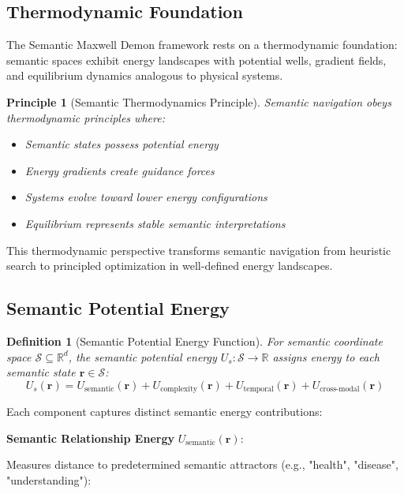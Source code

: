\documentclass[12pt,a4paper]{article}
\newtheorem{definition}{Definition}
\newtheorem{principle}{Principle}
\begin{document}
\subsection{Thermodynamic Foundation}

The Semantic Maxwell Demon framework rests on a thermodynamic foundation: semantic spaces exhibit energy landscapes with potential wells, gradient fields, and equilibrium dynamics analogous to physical systems.

\begin{principle}[Semantic Thermodynamics Principle]
Semantic navigation obeys thermodynamic principles where:
\begin{itemize}
\item Semantic states possess potential energy
\item Energy gradients create guidance forces
\item Systems evolve toward lower energy configurations
\item Equilibrium represents stable semantic interpretations
\end{itemize}
\end{principle}

This thermodynamic perspective transforms semantic navigation from heuristic search to principled optimization in well-defined energy landscapes.

\subsection{Semantic Potential Energy}

\begin{definition}[Semantic Potential Energy Function]
For semantic coordinate space $\mathcal{S} \subseteq \mathbb{R}^d$, the semantic potential energy $U_s: \mathcal{S} \to \mathbb{R}$ assigns energy to each semantic state $\mathbf{r} \in \mathcal{S}$:
\begin{equation}
U_s(\mathbf{r}) = U_{\text{semantic}}(\mathbf{r}) + U_{\text{complexity}}(\mathbf{r}) + U_{\text{temporal}}(\mathbf{r}) + U_{\text{cross-modal}}(\mathbf{r})
\end{equation}
\end{definition}

Each component captures distinct semantic energy contributions:

\textbf{Semantic Relationship Energy} $U_{\text{semantic}}(\mathbf{r})$:

Measures distance to predetermined semantic attractors (e.g., "health", "disease", "understanding"):
\end{document}
